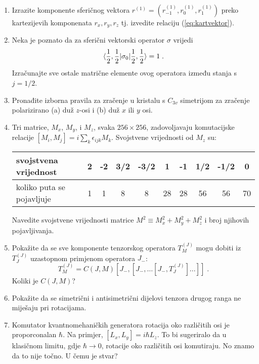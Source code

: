 \begin{enumerate}[label=\arabic{chapter}.\arabic*.]
\item
Izrazite komponente sferičnog vektora $r^{(1)} = (r^{(1)}_{-1}, r^{(1)}_{0},
r^{(1)}_{1})$ preko kartezijevih komponenata $r_x, r_y, r_z$ tj. izvedite
relaciju (\ref{eq:kartvektor}).

\item Neka je poznato da za sferični vektorski operator $\sigma$ vrijedi
\[  \langle \frac{1}{2}, \frac{1}{2} | \sigma_0 | \frac{1}{2}, \frac{1}{2} \rangle = 1 \;. \]
Izračunajte sve ostale matrične elemente ovog operatora između stanja
s $j = 1/2$.

\item Pronađite izborna pravila za zračenje u kristalu s $C_{3v}$
simetrijom za zračenje polarizirano (a) duž $z$-osi i (b) duž
$x$ ili $y$ osi. 

\item 
Tri matrice, $M_x$, $M_y$, i $M_z$, svaka $256\times 256$, zadovoljavaju
komutacijske relacije $[M_i, M_j] = i \sum_{k} \epsilon_{ijk} M_k$.
Svojstvene vrijednosti od $M_z$ su:
\begin{center}
\begin{tabular}[h]{l|ccccccccc}
\hline
svojstvena vrijednost & 2 & -2 & 3/2 & -3/2 & 1 & -1 & 1/2 & -1/2 & 0 \\ \hline
koliko puta se pojavljuje & 1 & 1 & 8 & 8 & 28 & 28 & 56 & 56 & 70 \\ \hline
\end{tabular}
\end{center}
Navedite svojstvene vrijednosti matrice $M^2 \equiv M_{x}^2 + M_{y}^2 + M_{z}^2$
i broj njihovih pojavljivanja.

\item Pokažite da se sve komponente tenzorskog operatora 
$T^{(J)}_M$ mogu dobiti iz $T^{(J)}_J$ uzastopnom primjenom operatora $J_-$:
\[ T^{(J)}_M = C(J,M) [J_-, [J_-, \dots [J_-, T^{(J)}_J]. . .]] \;. \]
Koliki je $C(J,M)$?

\item \label{zad:antisim} Pokažite da se simetrični i antisimetrični
dijelovi tenzora drugog ranga ne miješaju pri rotacijama.

\item Komutator kvantnomehaničkih generatora rotacija oko različitih osi
    je proporconalan $\hbar$. Na primjer, $[L_x, L_y] = i\hbar L_z$. To
    bi sugeriralo da u klasičnom limitu, gdje $\hbar\to 0$, rotacije
    oko različitih osi komutiraju. No znamo da to nije točno.
    U čemu je stvar?

\end{enumerate}

